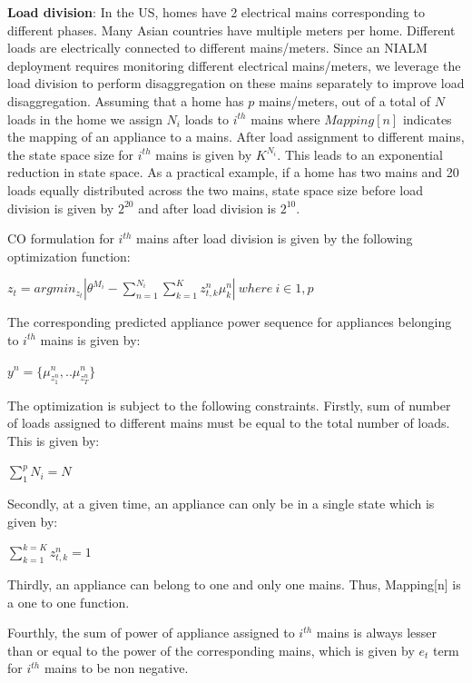 \documentclass[conference]{IEEEtran}
\begin{document}
\noindent \textbf{Load division}: In the US, homes have 2 electrical mains corresponding to different phases. Many Asian countries have multiple meters per home. Different loads are electrically connected to different mains/meters. Since an NIALM deployment requires monitoring different electrical mains/meters, we leverage the load division to perform disaggregation on these mains separately to improve load disaggregation. Assuming that a home has $p$ mains/meters, out of a total of $N$ loads in the home we assign $N_i$ loads to $i^{th}$ mains where $Mapping[n]$ indicates the mapping of an appliance to a mains.
After load assignment to different mains, the state space size for $i^{th}$ mains is given by $K^{N_i}$. This leads to an exponential reduction in state space. As a practical example, if a home has two mains and 20 loads equally distributed across the two mains, state space size before load division is given by $2^{20}$ and after load division is $2^{10}$.

\noindent CO formulation for $i^{th}$ mains after load division is given by the following optimization function: 

$z_t=arg min_{z_t}|\theta^{M_i}-\sum\limits_{n=1}^{N_i}\sum\limits_{k=1}^{K}z_{t,k}^n\mu_k^n| \:where\: i\in {1,p}$

\noindent The corresponding predicted appliance power sequence for appliances belonging to $i^{th}$ mains is given by:

$y^n=\{\mu_{z_1^n}^n,..\mu_{z_T^n}^n \}$

\noindent The optimization is subject to the following constraints. Firstly, sum of number of loads assigned to different mains must be equal to the total number of loads. This is given by:

 $\sum\limits_{1}^{p}{N_i}=N$

\noindent Secondly, at a given time, an appliance can only be in a single state which is given by:

 $\sum\limits_{k=1}^{k=K} z_{t,k}^n=1$ 

\noindent Thirdly, an appliance can belong to one and only one mains. Thus, Mapping[n] is a one to one function.

\noindent Fourthly, the sum of power of appliance assigned to $i^{th}$ mains is always lesser than or equal to the power of the corresponding mains, which is given by $e_t$ term for $i^{th}$ mains to be non negative.



\end{document}

